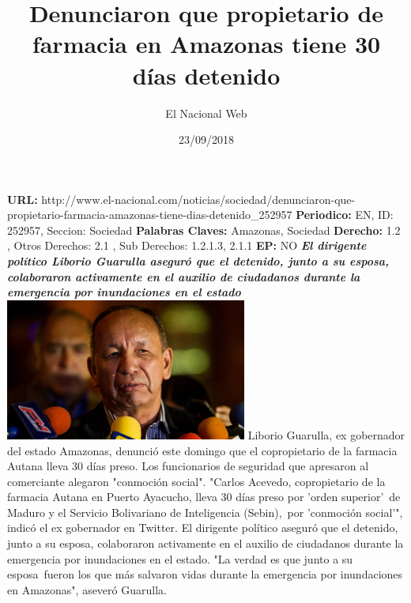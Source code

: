 \documentclass{article}%
\title{\textbf{Denunciaron que propietario de farmacia en Amazonas tiene 30 días detenido}}%
\author{El Nacional Web}%
\date{23/09/2018}%
\begin{document}
%
\normalsize%
\maketitle%
\textbf{URL: }%
http://www.el{-}nacional.com/noticias/sociedad/denunciaron{-}que{-}propietario{-}farmacia{-}amazonas{-}tiene{-}dias{-}detenido\_252957\newline%
%
\textbf{Periodico: }%
EN, %
ID: %
252957, %
Seccion: %
Sociedad\newline%
%
\textbf{Palabras Claves: }%
Amazonas, Sociedad\newline%
%
\textbf{Derecho: }%
1.2%
, Otros Derechos: %
2.1%
, Sub Derechos: %
1.2.1.3, 2.1.1%
\newline%
%
\textbf{EP: }%
NO\newline%
\newline%
%
\textbf{\textit{El dirigente político Liborio Guarulla aseguró que el detenido, junto a su esposa, colaboraron activamente en el auxilio de ciudadanos durante la emergencia por inundaciones en el estado}}%
\newline%
\newline%
%
\includegraphics[width=300px]{145.jpg}%
\newline%
%
Liborio Guarulla, ex gobernador del estado Amazonas, denunció este domingo que el copropietario de la farmacia Autana lleva 30 días preso. Los funcionarios de seguridad que apresaron al comerciante alegaron "conmoción social".%
\newline%
%
"Carlos Acevedo, copropietario de la farmacia Autana en Puerto Ayacucho, lleva 30 días preso por 'orden superior'~de Maduro y el Servicio Bolivariano de Inteligencia (Sebin),~por 'conmoción social'", indicó el ex gobernador en Twitter.%
\newline%
%
El dirigente político aseguró que el detenido, junto a su esposa, colaboraron activamente en el auxilio de ciudadanos durante la emergencia por inundaciones en el estado.%
\newline%
%
"La verdad es que junto a su esposa~fueron los que más salvaron vidas durante la emergencia por inundaciones en Amazonas", aseveró Guarulla.%
\newline%
%
\end{document}
